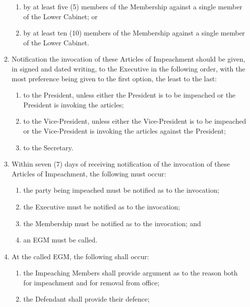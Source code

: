 \documentclass{scrartcl}
\begin{document}
\begin{enumerate}
\begin{enumerate}
                        \item by at least five (5) members of the Membership against a single member of the Lower Cabinet; or
                        \item by at least ten (10) members of the Membership against a single member of the Lower Cabinet.
                    \end{enumerate}
                \item Notification the invocation of these Articles of Impeachment should be given, in signed and dated writing, to the Executive in the following order, with the most preference being given to the first option, the least to the last:
                    \begin{enumerate}
                        \item to the President, unless either the President is to be impeached or the President is invoking the articles;
                        \item to the Vice-President, unless either the Vice-President is to be impeached or the Vice-President is invoking the articles against the President;
                        \item to the Secretary.
                    \end{enumerate}
                \item Within seven (7) days of receiving notification of the invocation of these Articles of Impeachment, the following must occur:
                    \begin{enumerate}
                        \item the party being impeached must be notified as to the invocation;
                        \item the Executive must be notified as to the invocation;
                        \item the Membership must be notified as to the invocation; and
                        \item an EGM must be called.
                    \end{enumerate}
                \item At the called EGM, the following shall occur:
                    \begin{enumerate}
                        \item the Impeaching Members shall provide argument as to the reason both for impeachment and for removal from office;
                        \item the Defendant shall provide their defence;

\end{enumerate}
\end{enumerate}
\end{document}
